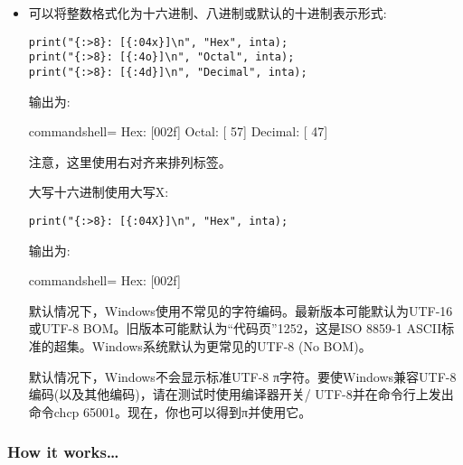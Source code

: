 \begin{itemize}
还可以将值居中:

\begin{lstlisting}[style=styleCXX]
print("inta is [{:^10}]\n", inta);
print("inta is [{:_^10}]\n", inta);
\end{lstlisting}

输出为:

\begin{tcblisting}{commandshell={}}
inta is [    47    ]
inta is [____47____]
\end{tcblisting}

\item 
可以将整数格式化为十六进制、八进制或默认的十进制表示形式:

\begin{lstlisting}[style=styleCXX]
print("{:>8}: [{:04x}]\n", "Hex", inta);
print("{:>8}: [{:4o}]\n", "Octal", inta);
print("{:>8}: [{:4d}]\n", "Decimal", inta);
\end{lstlisting}

输出为:

\begin{tcblisting}{commandshell={}}
    Hex: [002f]
  Octal: [  57]
Decimal: [  47]
\end{tcblisting}

注意，这里使用右对齐来排列标签。

大写十六进制使用大写X:

\begin{lstlisting}[style=styleCXX]
print("{:>8}: [{:04X}]\n", "Hex", inta);
\end{lstlisting}

输出为:

\begin{tcblisting}{commandshell={}}
    Hex: [002f]
\end{tcblisting}

\begin{tcolorbox}[colback=gray!5!white,colframe=gray!75!black,title=Tip]
默认情况下，Windows使用不常见的字符编码。最新版本可能默认为UTF-16或UTF-8 BOM。旧版本可能默认为“代码页”1252，这是ISO 8859-1 ASCII标准的超集。Windows系统默认为更常见的UTF-8 (No BOM)。

默认情况下，Windows不会显示标准UTF-8 π字符。要使Windows兼容UTF-8编码(以及其他编码)，请在测试时使用编译器开关/ UTF-8并在命令行上发出命令chcp 65001。现在，你也可以得到π并使用它。
\end{tcolorbox}
	
\end{itemize}

\subsubsection{How it works…}

